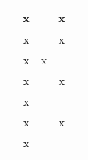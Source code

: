 \begin{table}[h]
\begin{tabular}{|l|l|l|l|l|}
		\cite{MozoID2017}                                   & \multicolumn{1}{c|}{x}                                         & \multicolumn{1}{c|}{}                                               & \multicolumn{1}{c|}{x}                                              & \multicolumn{1}{c|}{}                                               \\ \hline
		\cite{IsazaCN2017}                                   & \multicolumn{1}{c|}{x}                                         & \multicolumn{1}{c|}{}                                               & \multicolumn{1}{c|}{x}                                              & \multicolumn{1}{c|}{}                                               \\ \hline
		\cite{solano2019modeling}                                   & \multicolumn{1}{c|}{x}                                         & \multicolumn{1}{c|}{x}                                               & \multicolumn{1}{c|}{}                                              & \multicolumn{1}{c|}{}                                               \\ \hline
		\cite{Zaza2016}                                   & \multicolumn{1}{c|}{x}                                         & \multicolumn{1}{c|}{}                                               & \multicolumn{1}{c|}{x}                                              & \multicolumn{1}{c|}{}                                               \\ \hline
		\cite{Wang2016, Wang2017}                                   & \multicolumn{1}{c|}{x}                                         & \multicolumn{1}{c|}{}                                               & \multicolumn{1}{c|}{}                                              & \multicolumn{1}{c|}{}                                               \\ \hline
		\cite{FANG2017}                                   & \multicolumn{1}{c|}{x}                                         & \multicolumn{1}{c|}{}                                               & \multicolumn{1}{c|}{x}                                              & \multicolumn{1}{c|}{}                                               \\ \hline
		\cite{Qiao2017}                                   & \multicolumn{1}{c|}{x}                                         & \multicolumn{1}{c|}{}                                               & \multicolumn{1}{c|}{}                                              & \multicolumn{1}{c|}{}                                               \\ \hline

\end{tabular}
\end{table}
